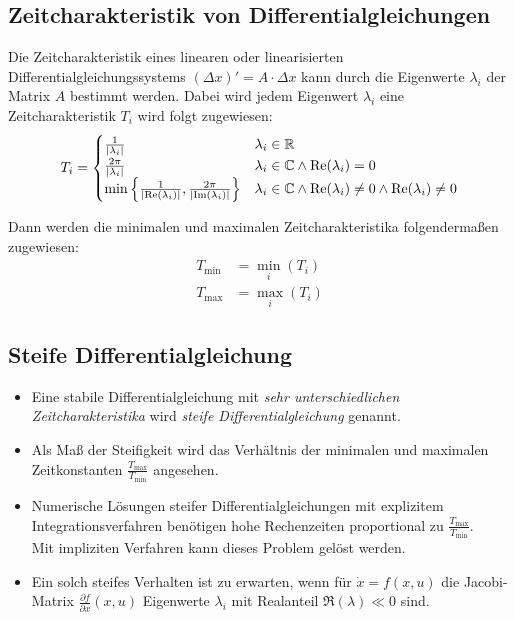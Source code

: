        \subsection{Zeitcharakteristik von Differentialgleichungen}
            \label{sec:mathezeitCharakteristik}
            
            Die Zeitcharakteristik eines linearen oder linearisierten Differentialgleichungssystems \( (\Delta x)' = A \cdot \Delta x \) kann durch die Eigenwerte \( \lambda _ i \) der Matrix \(A\) bestimmt werden. Dabei wird jedem Eigenwert \(\lambda_i\) eine Zeitcharakteristik \( T_i \) wird folgt zugewiesen:
            \begin{equation*}
	            T _ i =
		            \begin{cases}
			            \frac{1}{\abs{\lambda _ i}} & \lambda _ i \in \mathbb{R} \\
			            \frac{2\pi}{\abs{\lambda _ i}} & \lambda _ i \in \mathbb{C} \land \Re(\lambda _ i) = 0 \\
			            \min \Big\{ \frac{1}{\abs{\Re(\lambda _ i)}}, \frac{2\pi}{\abs{\Im(\lambda _ i)}} \Big\} & \lambda _ i \in \mathbb{C} \land \Re(\lambda _ i) \neq 0 \land \Re(\lambda _ i) \neq 0
		            \end{cases}
            \end{equation*}
            
            Dann werden die minimalen und maximalen Zeitcharakteristika folgendermaßen zugewiesen:
            \begin{align*}
	            T _ {\min} &= \min\limits _ i (T _ i) \\
	            T _ {\max} &= \max\limits _ i (T _ i)
            \end{align*}

        \subsection{Steife Differentialgleichung} %
            \label{sec:steifedgl}
        
            \begin{itemize}
            	\item Eine stabile Differentialgleichung mit \textit{sehr unterschiedlichen Zeitcharakteristika} wird \textit{steife Differentialgleichung} genannt.
            	\item Als Maß der Steifigkeit wird das Verhältnis der minimalen und maximalen Zeitkonstanten \( \frac{T_\text{max}}{T_\text{min}} \) angesehen.
            	\item Numerische Lösungen steifer Differentialgleichungen mit explizitem Integrationsverfahren benötigen hohe Rechenzeiten proportional zu \( \frac{T_\text{max}}{T_\text{min}} \). \\ Mit impliziten Verfahren kann dieses Problem gelöst werden.
            	\item Ein solch steifes Verhalten ist zu erwarten, wenn für \( \dot{x} = f(x, u) \) die Jacobi-Matrix \( \frac{\partial f}{\partial x}(x, u) \) Eigenwerte \( \lambda _ i \) mit Realanteil \( \Re(\lambda) \ll 0 \) sind.
            \end{itemize}

